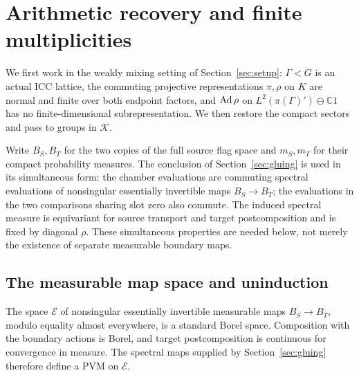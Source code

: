 \section{Arithmetic recovery and finite multiplicities}
\label{sec:recovery}

We first work in the weakly mixing setting of Section~\ref{sec:setup}:
\(\Gamma<G\) is an actual ICC lattice, the commuting projective representations
\(\pi,\rho\) on \(K\) are normal and finite over both endpoint factors, and
\(\operatorname{Ad}\rho\) on \(L^2(\pi(\Gamma)')\ominus\mathbb C1\) has no
finite-dimensional subrepresentation.  We then restore the compact sectors and
pass to groups in \(\mathscr K\).

Write \(B_S,B_T\) for the two copies of the full source flag space and
\(m_S,m_T\) for their compact probability measures.  The conclusion of
Section~\ref{sec:gluing} is used in its simultaneous form: the chamber
evaluations are commuting spectral evaluations of nonsingular essentially
invertible maps \(B_S\to B_T\); the evaluations in the two comparisons sharing
slot zero also commute.  The induced spectral measure is equivariant for
source transport and target postcomposition and is fixed by diagonal
\(\rho\).  These simultaneous properties are needed below, not merely the
existence of separate measurable boundary maps.

\subsection{The measurable map space and uninduction}

\begin{lemma}
\label{lem:recovery-map-space}
The space \(\mathscr E\) of nonsingular essentially invertible measurable
maps \(B_S\to B_T\), modulo equality almost everywhere, is a standard Borel
space.  Composition with the boundary actions is Borel, and target
postcomposition is continuous for convergence in measure.  The spectral
maps supplied by Section~\ref{sec:gluing} therefore define a PVM on
\(\mathscr E\).
\end{lemma}

